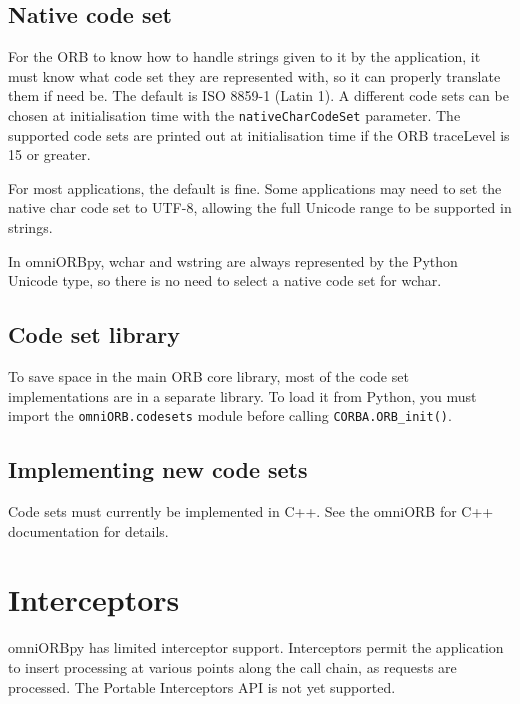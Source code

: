 \documentclass[11pt,twoside,a4paper]{book}
\newcommand{\code}[1]{\texttt{#1}}
\newcommand{\op}[1]{\texttt{#1()}}
\newcommand{\dsc}{\discretionary{}{}{}}
\begin{document}
\section{Native code set}

For the ORB to know how to handle strings given to it by the
application, it must know what code set they are represented with, so
it can properly translate them if need be. The default is ISO 8859-1
(Latin 1). A different code sets can be chosen at initialisation time
with the \code{nativeCharCodeSet} parameter. The supported code sets
are printed out at initialisation time if the ORB traceLevel is 15 or
greater.

For most applications, the default is fine. Some applications may need
to set the native char code set to UTF-8, allowing the full Unicode
range to be supported in strings.

In omniORBpy, wchar and wstring are always represented by the Python
Unicode type, so there is no need to select a native code set for
wchar.


\section{Code set library}

To save space in the main ORB core library, most of the code set
implementations are in a separate library. To load it from Python, you
must import the \code{omniORB.\dsc{}codesets} module before calling
\op{CORBA.ORB\_init}.


\section{Implementing new code sets}

Code sets must currently be implemented in C++. See the omniORB for
C++ documentation for details.



\chapter{Interceptors}
\label{chap:interceptors}

omniORBpy has limited interceptor support. Interceptors permit the
application to insert processing at various points along the call
chain, as requests are processed. The Portable Interceptors API is not
yet supported.
\end{document}
